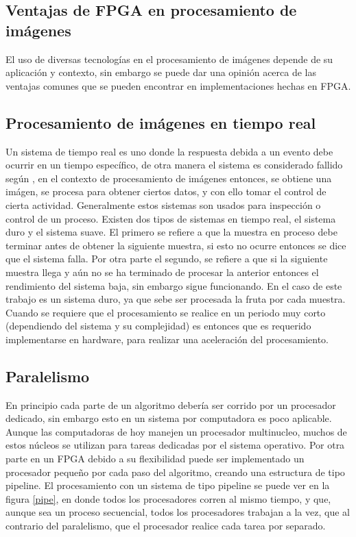\documentclass[twoside,spanish,ESP,MSc]{plantillaLabUPV}
\theoremstyle{definition}
\begin{document}
\subsection{Ventajas de FPGA en procesamiento de imágenes}


%
El uso de diversas tecnologías en el procesamiento de imágenes depende de su aplicación y contexto, sin embargo se puede dar una opinión acerca de las ventajas comunes que se pueden encontrar en implementaciones hechas en FPGA.

\subsection*{Procesamiento de imágenes en tiempo real}
Un sistema de tiempo real es uno donde la respuesta debida a un evento debe ocurrir en un tiempo específico, de otra manera el sistema es considerado fallido según \cite{baleyrt}, en el contexto de procesamiento de imágenes entonces, se obtiene una imágen, se procesa para obtener ciertos datos, y con ello tomar el control de cierta actividad. Generalmente estos sistemas son usados para inspección o control de un proceso. Existen dos tipos de sistemas en tiempo real, el sistema duro y el sistema suave. El primero se refiere a que la muestra en proceso debe terminar antes de obtener la siguiente muestra, si esto no ocurre entonces se dice que el sistema falla. Por otra parte el segundo, se refiere a que si la siguiente muestra llega y aún no se ha terminado de procesar la anterior entonces el rendimiento del sistema baja, sin embargo sigue funcionando. En el caso de este trabajo es un sistema duro, ya que sebe ser procesada la fruta por cada muestra. Cuando se requiere que el procesamiento se realice en un periodo muy corto (dependiendo del sistema y su complejidad) es entonces que es requerido implementarse en hardware, para realizar una aceleración del procesamiento.

\subsection*{Paralelismo}

En principio cada parte de un algoritmo debería ser corrido por un procesador dedicado, sin embargo esto en un sistema por computadora es poco aplicable. Aunque las computadoras de hoy manejen un procesador multinucleo, muchos de estos núcleos se utilizan para tareas dedicadas por el sistema operativo. Por otra parte en un FPGA debido a su flexibilidad puede ser implementado un procesador pequeño por cada paso del algoritmo, creando una estructura de tipo pipeline. El procesamiento con un sistema de tipo pipeline se puede ver en la figura \ref{pipe}, en donde todos los procesadores corren al mismo tiempo, y que, aunque sea un proceso secuencial, todos los procesadores trabajan a la vez, que al contrario del paralelismo, que el procesador realice cada tarea por separado.
\end{document}
